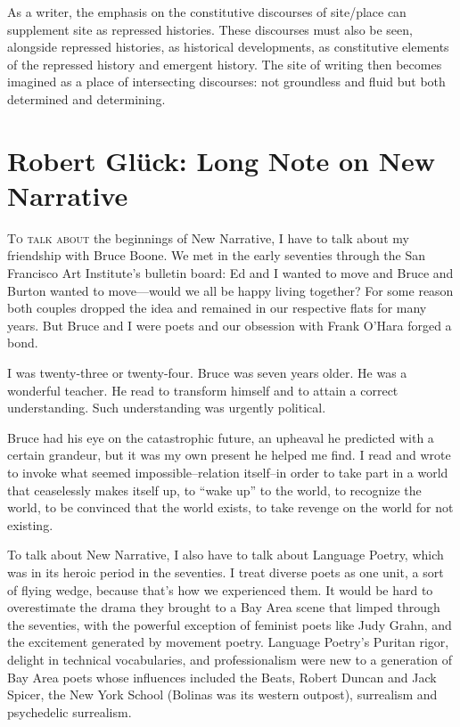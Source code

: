 \documentclass[
]{memoir}
\newlength{\drop}%
\begin{document}
As a writer, the emphasis on the constitutive discourses of site/place
can supplement site as repressed histories. These discourses must also
be seen, alongside repressed histories, as historical developments, as
constitutive elements of the repressed history and emergent history. The
site of writing then becomes imagined as a place of intersecting
discourses: not groundless and fluid but both determined and
determining.

\hypertarget{robert-gluxfcck-long-note-on-new-narrative}{%
\chapter{Robert Glück: Long Note on New
Narrative}\label{robert-gluxfcck-long-note-on-new-narrative}}

\lettrine[lines=3, findent=0em, nindent=0.1em, lhang=0]{T}{o talk about}
the beginnings of New Narrative, I have to talk about my friendship with
Bruce Boone. We met in the early seventies through the San Francisco Art
Institute's bulletin board: Ed and I wanted to move and Bruce and Burton
wanted to move---would we all be happy living together? For some reason
both couples dropped the idea and remained in our respective flats for
many years. But Bruce and I were poets and our obsession with Frank
O'Hara forged a bond.

I was twenty-three or twenty-four. Bruce was seven years older. He was a
wonderful teacher. He read to transform himself and to attain a correct
understanding. Such understanding was urgently political.

Bruce had his eye on the catastrophic future, an upheaval he predicted
with a certain grandeur, but it was my own present he helped me find. I
read and wrote to invoke what seemed impossible--relation itself--in
order to take part in a world that ceaselessly makes itself up, to
``wake up'' to the world, to recognize the world, to be convinced that
the world exists, to take revenge on the world for not existing.

To talk about New Narrative, I also have to talk about Language Poetry,
which was in its heroic period in the seventies. I treat diverse poets
as one unit, a sort of flying wedge, because that's how we experienced
them. It would be hard to overestimate the drama they brought to a Bay
Area scene that limped through the seventies, with the powerful
exception of feminist poets like Judy Grahn, and the excitement
generated by movement poetry. Language Poetry's Puritan rigor, delight
in technical vocabularies, and professionalism were new to a generation
of Bay Area poets whose influences included the Beats, Robert Duncan and
Jack Spicer, the New York School (Bolinas was its western outpost),
surrealism and psychedelic surrealism.
\end{document}
